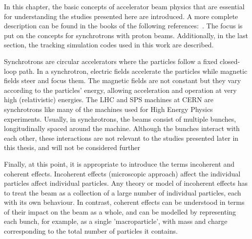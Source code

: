 In this chapter, the basic concepts of accelerator beam physics that are essential for understanding the studies presented here are introduced. A more complete description can be found in the books of the following references:~\cite{wolski2014, Wiedemann:1083415, Lee:1425444}. The focus is put on the concepts for synchrotrons with proton beams. Additionally, in the last section, the tracking simulation codes used in this work are described.

Synchrotrons are circular accelerators where the particles follow a fixed closed-loop path. In a synchrotron, electric fields accelerate the particles while magnetic fields steer and focus them. The magnetic fields are not constant but they vary according to the particles' energy, allowing acceleration and operation at very high (relativistic) energies. The LHC and SPS machines at CERN are synchrotrons like many of the machines used for High Energy Physics experiments. Usually, in synchrotrons, the beams consist of multiple bunches, longitudinally spaced around the machine.  Although the bunches interact with each other, these interactions are not relevant to the studies presented later in this thesis, and will not be considered further

Finally, at this point, it is appropriate to introduce the terms incoherent and coherent effects. Incoherent effects (microscopic approach) affect the individual particles affect individual particles.  Any theory or model of incoherent effects has to treat the beam as a collection of a large number of individual particles, each with its own behaviour. In contrast, coherent effects can be understood in terms of their impact on the beam as a whole, and can be modelled by representing each bunch, for example, as a single 'macroparticle', with mass and charge corresponding to the total number of particles it contains. %




